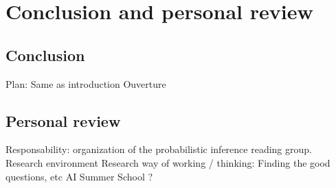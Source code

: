 \chapter{Conclusion and personal review}

\section{Conclusion}
Plan: Same as introduction
Ouverture

\section{Personal review}
Responsability: organization of the probabilistic inference reading group.
Research environment
Research way of working / thinking: Finding the good questions, etc
AI Summer School ?